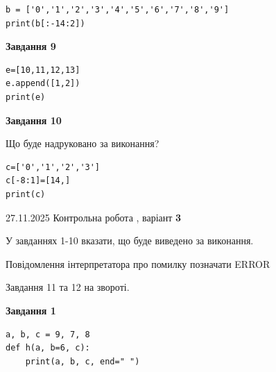 \documentclass[12pt, ukrainian]{article}
\begin{document}
{{{\begin{minipage}[t]{10.5cm}
\begin{verbatim}
b = ['0','1','2','3','4','5','6','7','8','9']
print(b[:-14:2])
\end{verbatim}



\begin{center}
\textbf{Завдання 9}
\end{center}

\begin{verbatim}
e=[10,11,12,13]
e.append([1,2])
print(e)
\end{verbatim}



\begin{center}
\textbf{Завдання 10}
\end{center}
Що буде надруковано за виконання?\par
\begin{verbatim}
c=['0','1','2','3']
c[-8:1]=[14,]
print(c)
\end{verbatim}

\end{minipage}

}
\newpage

{{ 27.11.2025 Контрольна робота , варіант  \No \textbf { 3 }\par}}
{

{%



У завданнях 1-10 вказати, що буде виведено за виконання.

Повідомлення інтерпретатора про помилку позначати ERROR

Завдання 11 та 12 на звороті.

\begin{minipage}[t]{7.5cm}

\begin{center}
\textbf{Завдання 1}
\end{center}

\begin{verbatim}
a, b, c = 9, 7, 8
def h(a, b=6, c):
    print(a, b, c, end=" ")


\end{verbatim}
\end{minipage}}}}}
\end{document}
